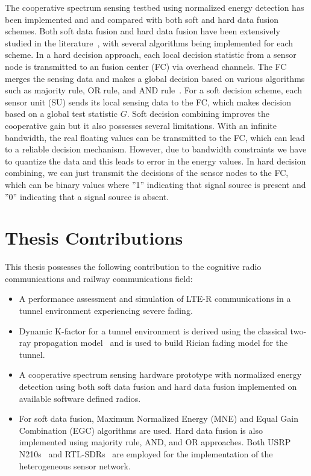 The cooperative spectrum sensing testbed using normalized energy detection has been implemented and and compared with both soft and hard data fusion schemes. Both soft data fusion and hard data fusion have been extensively studied in the literature~\cite{arhtn9,inphtn10,arhtn11}, with several algorithms being implemented for each scheme. In a hard decision approach, each local decision statistic from a sensor node is transmitted to an fusion center (FC) via overhead channels. The FC merges the sensing data and makes a global decision based on various algorithms such as majority rule, OR rule, and AND rule~\cite{inhtn12}. For a soft decision scheme, each sensor unit (SU) sends its local sensing data to the FC, which makes decision based on a global test statistic $G$. Soft decision combining improves the cooperative gain but it also possesses several limitations. With an infinite bandwidth, the real floating values can be transmitted to the FC, which can lead to a reliable decision mechanism. However, due to bandwidth constraints we have to quantize the data and this leads to error in the energy values. In hard decision combining, we can just transmit the decisions of the sensor nodes to the FC, which can be binary values where ''1'' indicating that signal source is present and ''0'' indicating that a signal source is absent.
\section{Thesis Contributions}
This thesis possesses the following contribution to the cognitive radio communications and railway communications field:

\begin{itemize}
\item A performance assessment and simulation of LTE-R communications in a tunnel environment experiencing severe fading.

\item Dynamic K-factor for a tunnel environment is derived using the classical two-ray propagation model~\cite{booklter11} and is used to build Rician fading model for the tunnel.

\item A cooperative spectrum sensing hardware prototype with normalized energy detection using both soft data fusion and hard data fusion implemented on available software defined radios.

\item For soft data fusion, Maximum Normalized Energy (MNE) and Equal Gain Combination (EGC) algorithms are used. Hard data fusion is also implemented using majority rule, AND, and OR approaches. Both USRP N210s~\cite{usrp} and RTL-SDRs~\cite{rtlsdr} are employed for the implementation of the heterogeneous sensor network.
\end{itemize}


